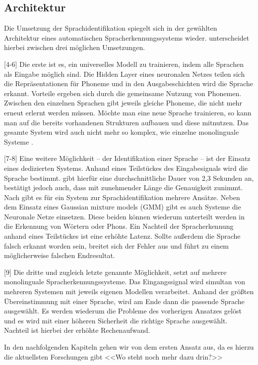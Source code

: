 \subsection{Architektur}
\cite{Gonzalez.2015} Die Umsetzung der Sprachidentifikation spiegelt sich in der gewählten Architektur eines automatischen Spracherkennungssystems wieder. \cite{Gonzalez.2015} unterscheidet hierbei zwischen drei möglichen Umsetzungen.

[4-6] Die erste ist es, ein universelles Modell zu trainieren, indem alle Sprachen als Eingabe möglich sind. Die Hidden Layer eines neuronalen Netzes teilen sich die Repräsentationen für Phoneme und in den Ausgabeschichten wird die Sprache erkannt.
Vorteile ergeben sich durch die gemeinsame Nutzung von Phonemen. Zwischen den einzelnen Sprachen gibt jeweils gleiche Phoneme, die nicht mehr erneut erlernt werden müssen. Möchte man eine neue Sprache trainieren, so kann man auf die bereits vorhandenen Strukturen aufbauen und diese mitnutzen.
Das gesamte System wird auch nicht mehr so komplex, wie einzelne monolinguale Systeme \cite{Bartz.2017}.

[7-8] Eine weitere Möglichkeit – der Identifikation einer Sprache – ist der Einsatz eines dedizierten Systems. Anhand eines Teilstückes des Eingabesignals wird die Sprache bestimmt. \cite{Niesler.2006} gibt hierfür eine durchschnittliche Dauer von 2,3 Sekunden an, bestätigt jedoch auch, dass mit zunehmender Länge die Genauigkeit zunimmt.
Nach \cite{Niesler.2006} gibt es für ein System zur Sprachidentifikation mehrere Ansätze. Neben dem Einsatz eines Gaussian mixture models (GMM) gibt es auch Systeme die Neuronale Netze einsetzen. Diese beiden können wiederum unterteilt werden in die Erkennung von Wörtern oder Phons.
Ein Nachteil der Spracherkennung anhand eines Teilstückes ist eine erhöhte Latenz. Sollte außerdem die Sprache falsch erkannt worden sein, breitet sich der Fehler aus und führt zu einem möglicherweise falschen Endresultat.

[9] Die dritte und zugleich letzte genannte Möglichkeit, setzt auf mehrere monolinguale Spracherkennungssysteme. Das Eingangssignal wird simultan von mehreren Systemen mit jeweils eigenen Modellen verarbeitet.
Anhand der größten Übereinstimmung mit einer Sprache, wird am Ende dann die passende Sprache ausgewählt. Es werden wiederum die Probleme des vorherigen Ansatzes gelöst und es wird mit einer höheren Sicherheit die richtige Sprache ausgewählt.
Nachteil ist hierbei der erhöhte Rechenaufwand.

In den nachfolgenden Kapiteln gehen wir von dem ersten Ansatz aus, da es hierzu die aktuellsten Forschungen gibt \cite{Gonzalez.2015} <<Wo steht noch mehr dazu drin?>>

